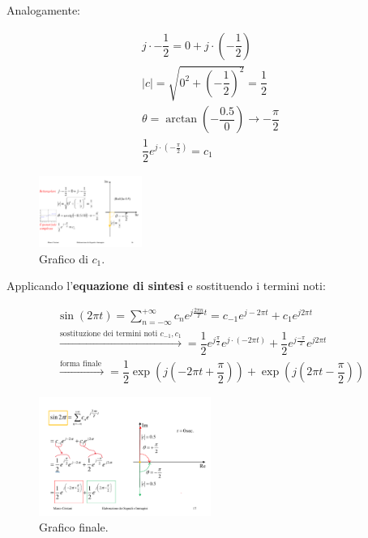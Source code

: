 \documentclass[a4paper]{article}
\begin{document}
	\newpage
	\noindent
	Analogamente:
	
	\begin{gather*}
		j \cdot -\dfrac{1}{2} = 0 + j \cdot \left(-\dfrac{1}{2}\right) \\
		|c| = \sqrt{0^{2} + \left(-\dfrac{1}{2}\right)^{2}} = \dfrac{1}{2} \\
		\theta = \arctan\left(-\dfrac{0.5}{0}\right) \rightarrow -\dfrac{\pi}{2} \\
		\dfrac{1}{2} e^{j \cdot \left(-\frac{\pi}{2}\right)} = c_{1}
	\end{gather*}

	\begin{figure}[!htp]
		\centering
		\includegraphics[width=0.3\textwidth]{img/fourier_eg2_2.pdf}
		\caption{Grafico di $c_{1}$.}
	\end{figure}

	\newpage
	\noindent
	Applicando l'\textbf{equazione di sintesi} e sostituendo i termini noti:
	
	\begin{gather*}
		\sin{\left(2 \pi t\right)} = \sum_{n = -\infty}^{+\infty} c_{n} e^{j \frac{2 \pi n}{T} t} = c_{-1} e^{j-2\pi t} + c_{1} e^{j2\pi t} \\
		\xrightarrow{\text{sostituzione dei termini noti }c_{-1}, c_{1}} = \dfrac{1}{2} e^{j \frac{\pi}{2}} e^{j \cdot \left(-2 \pi t\right)} + \dfrac{1}{2}  e^{j \frac{-\pi}{2}} e^{j 2 \pi t} \\
		\xrightarrow{\text{forma finale }} = \dfrac{1}{2} \exp{\left(j\left(-2 \pi t + \dfrac{\pi}{2}\right)\right)} + \exp{\left(j\left(2 \pi t - \dfrac{\pi}{2}\right)\right)}
	\end{gather*}

	\begin{figure}[!htp]
		\centering
		\includegraphics[width=0.5\textwidth]{img/fourier_eg2_3.pdf}
		\caption{Grafico finale.}
	\end{figure}
\end{document}

